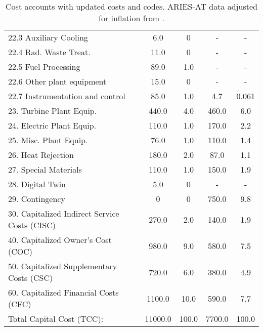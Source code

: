 \begin{table}[h!]
{\begin{tabular}{lcccc}
\hspace{10mm}22.3 Auxiliary Cooling & 6.0 & 0 & - & - \\
\hspace{10mm}22.4 Rad. Waste Treat. & 11.0 & 0 & - & - \\
\hspace{10mm}22.5 Fuel Processing & 89.0 & 1.0 & - & - \\
\hspace{10mm}22.6 Other plant equipment & 15.0 & 0 & - & - \\
\hspace{10mm}22.7 Instrumentation and control & 85.0 & 1.0 & 4.7 & 0.061 \\
\hspace{5mm}23. Turbine Plant Equip. & 440.0 & 4.0 & 460.0 & 6.0 \\
\hspace{5mm}24. Electric Plant Equip. & 110.0 & 1.0 & 170.0 & 2.2 \\
\hspace{5mm}25. Misc. Plant Equip. & 76.0 & 1.0 & 110.0 & 1.4 \\
\hspace{5mm}26. Heat Rejection & 180.0 & 2.0 & 87.0 & 1.1 \\
\hspace{5mm}27. Special Materials & 110.0 & 1.0 & 150.0 & 1.9 \\
\hspace{5mm}28. Digital Twin & 5.0 & 0 & - & - \\
\hspace{5mm}29. Contingency & 0 & 0 & 750.0 & 9.8 \\
30. Capitalized Indirect Service Costs (CISC) & 270.0 & 2.0 & 140.0 & 1.9 \\
40. Capitalized Owner’s Cost (COC) & 980.0 & 9.0 & 580.0 & 7.5 \\
50. Capitalized Supplementary Costs (CSC) & 720.0 & 6.0 & 380.0 & 4.9 \\
60. Capitalized Financial Costs (CFC) & 1100.0 & 10.0 & 590.0 & 7.7 \\
\hline
Total Capital Cost (TCC): & 11000.0 & 100.0 & 7700.0 & 100.0 \\
\hline
\end{tabular}
}
\caption{Cost accounts with updated costs and codes. ARIES-AT data adjusted for inflation from \cite{gordon1986mirror}.}
\label{tab:costs_updated_codes}
\end{table}


